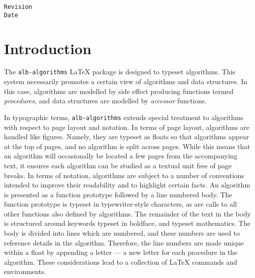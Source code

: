 \documentclass[11pt,a4paper,oneside,titlepage]{alb-latex}
\begin{document}
\begin{albTitlePage}

  \verb$Revision$\\
  \verb$Date$

\end{albTitlePage}




\section{Introduction}
\label{sec:alb-algorithms-documentation:intr}

The \texttt{alb-algorithms} \LaTeX{} package is designed to typeset
algorithms.  This system necessarily promotes a certain view of
algorithms and data structures.  In this case, algorithms are modelled
by side effect producing functions termed \emph{procedures}, and data
structures are modelled by \emph{accessor} functions.

In typographic terms, \texttt{alb-algorithms} extends special treatment
to algorithms with respect to page layout and notation.  In terms of
page layout, algorithms are handled like figures.  Namely, they are
typeset as floats so that algorithms appear at the top of pages, and no
algorithm is split across pages.  While this means that an algorithm
will occasionally be located a few pages from the accompanying text, it
ensures each algorithm can be studied as a textual unit free of page
breaks.  In terms of notation, algorithms are subject to a number of
conventions intended to improve their readability and to highlight
certain facts.  An algorithm is presented as a function prototype
followed by a line numbered body.  The function prototype is typeset in
typewriter-style characters, as are calls to all other functions also
defined by algorithms.  The remainder of the text in the body is
structured around keywords typeset in boldface, and typeset mathematics.
The body is divided into lines which are numbered, and these numbers are
used to reference details in the algorithm.  Therefore, the line numbers
are made unique within a float by appending a letter --- a new letter
for each procedure in the algorithm.  These considerations lead to a
collection of \LaTeX{} commands and environments.
\end{document}
